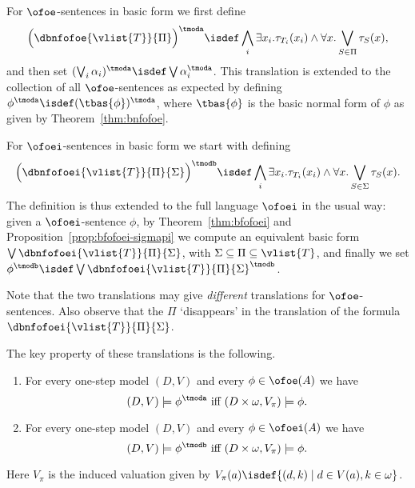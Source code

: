 \begin{definition}
\label{d:7-21}
For $\ofoe$-sentences in basic form we first define
\[
   \Big( \dbnfofoe{\vlist{T}}{\Pi} \Big)^{\tmoda} 
\isdef \bigwedge_{i} \exists x_i. \tau_{T_i}(x_i) \land 
\forall x. \bigvee_{S\in\Pi} \tau_S(x),
\]
and then set $(\bigvee_{i} \alpha_{i})^{\tmoda} \isdef \bigvee 
\alpha_{i}^{\tmoda}$.
This translation is extended to the collection of all $\ofoe$-sentences as expected by 
defining $\phi^{\tmoda} \isdef (\tbas{\phi})^{\tmoda}$, where $\tbas{\phi}$
is the basic normal form of $\phi$ as given by Theorem~\ref{thm:bnfofoe}.

For $\ofoei$-sentences in basic form we start with defining
\[
\Big( \dbnfofoei{\vlist{T}}{\Pi}{\Sigma} \Big)^{\tmodb} 
\isdef \bigwedge_{i} \exists x_i. \tau_{T_i}(x_i) \land 
\forall x. \bigvee_{S\in\Sigma} \tau_S(x).
\]
The definition is thus extended to the full language $\ofoei$ in the usual way: %
given a $\ofoei$-sentence $\phi$, by Theorem~\ref{thm:bfofoei} and
Proposition~\ref{prop:bfofoei-sigmapi} we compute an equivalent
basic form $\bigvee \dbnfofoei{\vlist{T}}{\Pi}{\Sigma}$, with 
$\Sigma \subseteq \Pi \subseteq \vlist{T}$, and finally we set
$\phi^{\tmodb}\isdef \bigvee \dbnfofoei{\vlist{T}}{\Pi}{\Sigma}^{\tmodb}$.
\end{definition}

Note that the two translations may give \emph{different} translations for 
$\ofoe$-sentences.
Also observe that the $\Pi$ `disappears' in the translation of the formula
$\dbnfofoei{\vlist{T}}{\Pi}{\Sigma}$.

The key property of these translations is the following.

\begin{proposition}
\label{p-1P}
\begin{enumerate}
\item
For every one-step model $(D,V)$ and every $\phi \in \ofoe(A)$ we have
\begin{equation}
\label{eq-0cr}
(D,V) \models \phi^{\tmoda} \text{ iff } (D\times \omega,V_\pi) \models \phi.
\end{equation}
\item
For every one-step model $(D,V)$ and every $\phi \in \ofoei(A)$ we have
\begin{equation}
\label{eq-1cr}
(D,V) \models \phi^{\tmodb} \text{ iff } (D\times \omega,V_\pi) \models \phi.
\end{equation}
\end{enumerate}
\noindent
Here $V_{\pi}$ %
 is the induced valuation given by 
$V_{\pi}(a) \isdef \{ (d,k) \mid d \in V(a), k\in\omega\}$.
\end{proposition}

